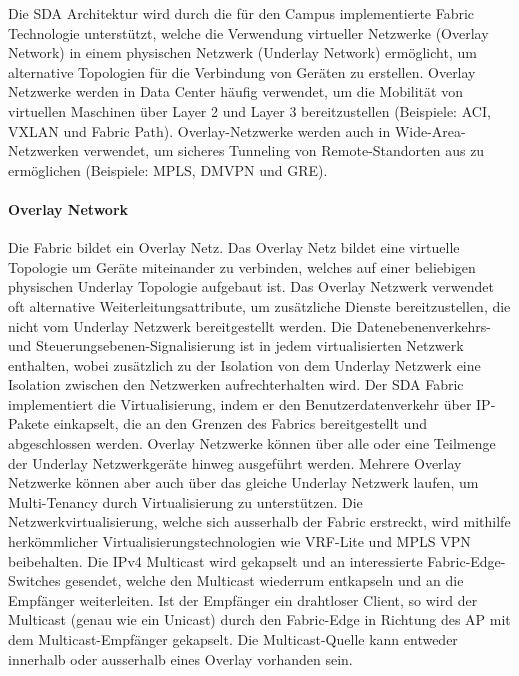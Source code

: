 Die SDA Architektur wird durch die für den Campus implementierte Fabric Technologie unterstützt, welche die Verwendung virtueller Netzwerke (Overlay Network) in einem physischen Netzwerk (Underlay Network) ermöglicht, um alternative Topologien für die Verbindung von Geräten zu erstellen. Overlay Netzwerke werden in Data Center häufig verwendet, um die Mobilität von virtuellen Maschinen über Layer 2 und Layer 3 bereitzustellen (Beispiele: ACI, VXLAN und Fabric Path). Overlay-Netzwerke werden auch in Wide-Area-Netzwerken verwendet, um sicheres Tunneling von Remote-Standorten aus zu ermöglichen (Beispiele: MPLS, DMVPN und GRE). \cite{sda-designguide}

\paragraph{Overlay Network}
Die Fabric bildet ein Overlay Netz. Das Overlay Netz bildet eine virtuelle Topologie um Geräte miteinander zu verbinden, welches auf einer beliebigen physischen Underlay Topologie aufgebaut ist. Das Overlay Netzwerk verwendet oft alternative Weiterleitungsattribute, um zusätzliche Dienste bereitzustellen, die nicht vom Underlay Netzwerk bereitgestellt werden. 
Die Datenebenenverkehrs- und Steuerungsebenen-Signalisierung ist in jedem virtualisierten Netzwerk enthalten, wobei zusätzlich zu der Isolation von dem Underlay Netzwerk eine Isolation zwischen den Netzwerken aufrechterhalten wird. Der SDA Fabric implementiert die Virtualisierung, indem er den Benutzerdatenverkehr über IP-Pakete einkapselt, die an den Grenzen des Fabrics bereitgestellt und abgeschlossen werden.
Overlay Netzwerke können über alle oder eine Teilmenge der Underlay Netzwerkgeräte hinweg ausgeführt werden. Mehrere Overlay Netzwerke können aber auch über das gleiche Underlay Netzwerk laufen, um Multi-Tenancy durch Virtualisierung zu unterstützen. Die Netzwerkvirtualisierung, welche sich ausserhalb der Fabric erstreckt, wird mithilfe herkömmlicher Virtualisierungstechnologien wie VRF-Lite und MPLS VPN beibehalten.
Die IPv4 Multicast wird gekapselt und an interessierte Fabric-Edge-Switches gesendet, welche den Multicast wiederrum entkapseln und an die Empfänger weiterleiten. Ist der Empfänger ein drahtloser Client, so wird der Multicast (genau wie ein Unicast) durch den Fabric-Edge in Richtung des AP mit dem Multicast-Empfänger gekapselt. Die Multicast-Quelle kann entweder innerhalb oder ausserhalb eines Overlay vorhanden sein. \cite{sda-designguide}

